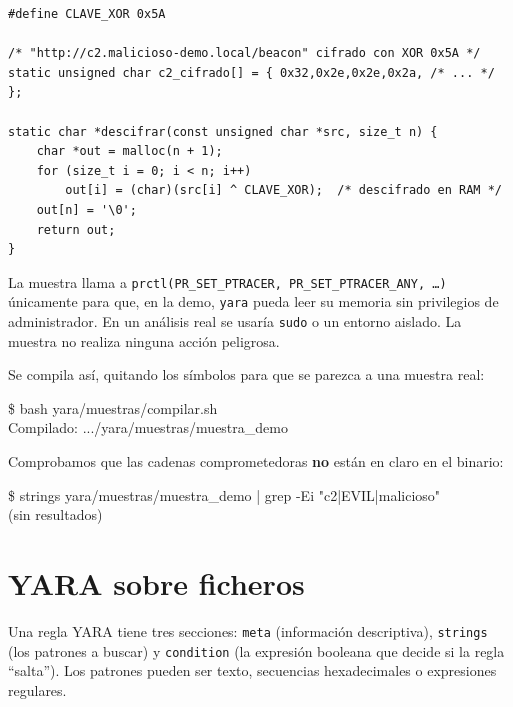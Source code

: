 \documentclass[11pt,a4paper]{article}
\begin{document}
\begin{lstlisting}[style=c,caption={Fragmento de \texttt{muestra\_demo.c}},captionpos=b]
#define CLAVE_XOR 0x5A

/* "http://c2.malicioso-demo.local/beacon" cifrado con XOR 0x5A */
static unsigned char c2_cifrado[] = { 0x32,0x2e,0x2e,0x2a, /* ... */ };

static char *descifrar(const unsigned char *src, size_t n) {
    char *out = malloc(n + 1);
    for (size_t i = 0; i < n; i++)
        out[i] = (char)(src[i] ^ CLAVE_XOR);  /* descifrado en RAM */
    out[n] = '\0';
    return out;
}
\end{lstlisting}

\begin{tcolorbox}[colback=orange!8,colframe=orange!70!black,title=Nota de seguridad,
  fonttitle=\bfseries,boxrule=0.6pt,arc=2pt]
La muestra llama a \texttt{prctl(PR\_SET\_PTRACER, PR\_SET\_PTRACER\_ANY, \dots)}
únicamente para que, en la demo, \texttt{yara} pueda leer su memoria sin
privilegios de administrador. En un análisis real se usaría \texttt{sudo} o un
entorno aislado. La muestra no realiza ninguna acción peligrosa.
\end{tcolorbox}

Se compila así, quitando los símbolos para que se parezca a una muestra real:

\begin{terminal}
\$ bash yara/muestras/compilar.sh\\
Compilado: .../yara/muestras/muestra\_demo
\end{terminal}

Comprobamos que las cadenas comprometedoras \textbf{no} están en claro en el binario:

\begin{terminal}
\$ strings yara/muestras/muestra\_demo | grep -Ei "c2|EVIL|malicioso"\\
(sin resultados)
\end{terminal}

\section{YARA sobre ficheros}

Una regla YARA tiene tres secciones: \texttt{meta} (información descriptiva),
\texttt{strings} (los patrones a buscar) y \texttt{condition} (la expresión
booleana que decide si la regla ``salta''). Los patrones pueden ser texto,
secuencias hexadecimales o expresiones regulares.
\end{document}
